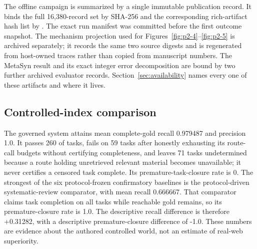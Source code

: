 The offline campaign is summarized by a single immutable publication record.
It binds the full 16,380-record set by SHA-256
and the corresponding rich-artifact hash list by
.
The exact run manifest was committed before the first outcome snapshot.  The
mechanism projection used for Figures~\ref{fig:p2-4}--\ref{fig:p2-5} is archived
separately; it records the same two source digests and is regenerated from
host-owned traces rather than copied from manuscript numbers.  The MetaSyn
result and its exact integer error decomposition are bound by two further
archived evaluator records.  Section~\ref{sec:availability} names every one of
these artifacts and where it lives.

\subsection{Controlled-index comparison}
The governed system attains mean complete-gold recall 0.979487 and precision 1.0.  It
passes 260 of \OfflineTaskCount{} tasks, fails on 59 tasks after honestly exhausting its
route-call budgets without certifying completeness, and leaves 71 tasks
undetermined because a route holding unretrieved relevant material becomes
unavailable; it never certifies a censored task complete.  Its premature-task-closure rate is
0.  The strongest of the six protocol-frozen confirmatory baselines is the
protocol-driven systematic-review comparator, with mean recall 0.666667.  That
comparator claims task completion on all \OfflineTaskCount{} tasks while reachable gold remains,
so its premature-closure rate is 1.0.  The descriptive recall difference is
therefore +0.31282, with a descriptive premature-closure difference of -1.0.
These numbers are evidence about the authored controlled world, not an estimate
of real-web superiority.

